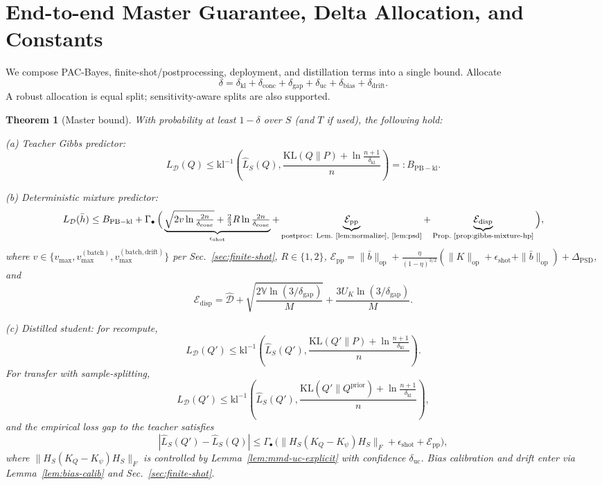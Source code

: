 \documentclass{article}
\newtheorem{theorem}{Theorem}
\begin{document}
\section{End-to-end Master Guarantee, Delta Allocation, and Constants}\label{sec:master}
We compose PAC-Bayes, finite-shot/postprocessing, deployment, and distillation terms into a single bound. Allocate
\[
\delta=\delta_{\mathrm{kl}}+\delta_{\mathrm{conc}}+\delta_{\mathrm{gap}}+\delta_{\mathrm{uc}}+\delta_{\mathrm{bias}}+\delta_{\mathrm{drift}}.
\]
A robust allocation is equal split; sensitivity-aware splits are also supported.

\begin{theorem}[Master bound]\label{thm:master}
With probability at least $1-\delta$ over $S$ (and $T$ if used), the following hold:

(a) Teacher Gibbs predictor:
\[
L_\mathcal{D}(Q) \le \mathrm{kl}^{-1}\!\left(\hat{L}_S(Q), \frac{\mathrm{KL}(Q\|P)+\ln\frac{n+1}{\delta_{\mathrm{kl}}}}{n}\right)=:B_{\mathrm{PB-kl}}.
\]

(b) Deterministic mixture predictor:
\[
L_\mathcal{D}(\bar{h}) \le B_{\mathrm{PB-kl}} + \Gamma_{\bullet}\, \Big( \underbrace{\sqrt{2 v \ln\tfrac{2n}{\delta_{\mathrm{conc}}}} + \tfrac{2}{3} R \ln\tfrac{2n}{\delta_{\mathrm{conc}}}}_{\epsilon_{\mathrm{shot}}} + \underbrace{\mathcal{E}_{\mathrm{pp}}}_{\text{postproc: Lem.~\ref{lem:normalize}, \ref{lem:psd}}} + \underbrace{\mathcal{E}_{\mathrm{disp}}}_{\text{Prop.~\ref{prop:gibbs-mixture-hp}}} \Big),
\]
where $v\in\{v_{\max},v_{\max}^{(\mathrm{batch})},v_{\max}^{(\mathrm{batch,drift})}\}$ per Sec.~\ref{sec:finite-shot}, $R\in\{1,2\}$, $\mathcal{E}_{\mathrm{pp}}=\|\bar{b}\|_{\mathrm{op}} + \frac{\eta}{(1-\eta)^{3/2}}(\|K\|_{\mathrm{op}}+\epsilon_{\mathrm{shot}}+\|\bar{b}\|_{\mathrm{op}}) + \Delta_{\mathrm{PSD}}$, and
\[
\mathcal{E}_{\mathrm{disp}}=\widehat{\mathcal{D}} + \sqrt{\frac{2\widehat{\mathbb{V}}\ln(3/\delta_{\mathrm{gap}})}{M}} + \frac{3U_K\ln(3/\delta_{\mathrm{gap}})}{M}.
\]

(c) Distilled student: for recompute,
\[
L_\mathcal{D}(Q') \le \mathrm{kl}^{-1}\!\left(\hat{L}_S(Q'), \frac{\mathrm{KL}(Q'\|P)+\ln\frac{n+1}{\delta_{\mathrm{kl}}}}{n}\right).
\]
For transfer with sample-splitting,
\[
L_\mathcal{D}(Q') \le \mathrm{kl}^{-1}\!\left(\hat{L}_S(Q'), \frac{\mathrm{KL}(Q'\|Q^{\mathrm{prior}})+\ln\frac{n+1}{\delta_{\mathrm{kl}}}}{n}\right),
\]
and the empirical loss gap to the teacher satisfies
\[
|\hat{L}_S(Q')-\hat{L}_S(Q)| \le \Gamma_{\bullet}\,\Big( \|H_S (K_Q-K_\psi) H_S\|_{F} + \epsilon_{\mathrm{shot}} + \mathcal{E}_{\mathrm{pp}}\Big),
\]
where $\|H_S (K_Q-K_\psi) H_S\|_{F}$ is controlled by Lemma~\ref{lem:mmd-uc-explicit} with confidence $\delta_{\mathrm{uc}}$. Bias calibration and drift enter via Lemma~\ref{lem:bias-calib} and Sec.~\ref{sec:finite-shot}.
\end{theorem}
\end{document}
